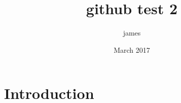 \documentclass{article}
\title{github test 2}
\author{james }
\date{March 2017}
\begin{document}
\maketitle

\section{Introduction}
\end{document}
